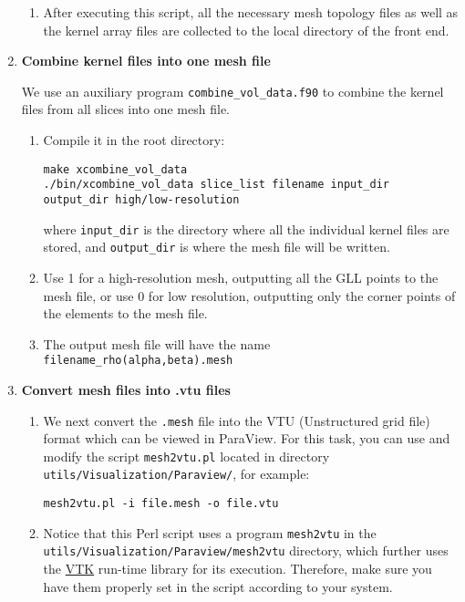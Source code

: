 \begin{enumerate}
\begin{enumerate}
\item After executing this script, all the necessary mesh topology files
as well as the kernel array files are collected to the local directory
of the front end.
\end{enumerate}
\item \textbf{Combine kernel files into one mesh file}


We use an auxiliary program \texttt{combine\_vol\_data.f90} to combine
the kernel files from all slices into one mesh file.
\begin{enumerate}
\item Compile it in the root directory:
{\footnotesize
\begin{verbatim}
make xcombine_vol_data
./bin/xcombine_vol_data slice_list filename input_dir output_dir high/low-resolution
\end{verbatim}
}
where \texttt{input\_dir} is the directory where all the individual
kernel files are stored, and \texttt{output\_dir} is where the mesh
file will be written.

\item Use 1 for a high-resolution mesh, outputting all the GLL points to
the mesh file, or use 0 for low resolution, outputting only the corner
points of the elements to the mesh file.
\item The output mesh file will have the name \texttt{filename\_rho(alpha,beta).mesh}
\end{enumerate}

\item \textbf{Convert mesh files into .vtu files}

\begin{enumerate}
\item We next convert the \texttt{.mesh} file into the VTU (Unstructured
grid file) format which can be viewed in ParaView. For this task,
you can use and modify the script \texttt{mesh2vtu.pl} located in
directory \texttt{utils/Visualization/Paraview/}, for example:

{\footnotesize
\begin{verbatim}
mesh2vtu.pl -i file.mesh -o file.vtu
\end{verbatim}
}

\item Notice that this Perl script uses a program \texttt{mesh2vtu} in the
\texttt{\small utils/Visualization/Paraview/mesh2vtu} directory, which further
uses the \href{http://www.vtk.org/}{VTK} run-time library
for its execution. Therefore, make sure you have them properly set
in the script according to your system.
\end{enumerate}


\end{enumerate}
